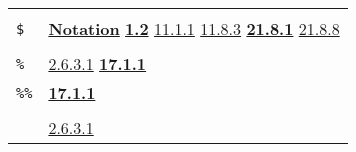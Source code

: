 \documentclass[a4paper,]{article}
\begin{document}
\begin{longtable}[]{@{}ll@{}}
\begin{minipage}[t]{0.70\columnwidth}
\strut
\end{minipage}\tabularnewline
\begin{minipage}[t]{0.24\columnwidth}\raggedright\strut
\texttt{\$}\strut
\end{minipage} & \begin{minipage}[t]{0.70\columnwidth}\raggedright\strut
\textbf{\href{00-front-matter.md\#notation}{Notation}} \textbf{\href{01-basic-introduction.md\#12-typing-1}{1.2}}
\href{11-input-output.md\#1111-input}{11.1.1} \href{11-input-output.md\#1183-tyi}{11.8.3}
\textbf{\href{21-interrupts.md\#2181-char-received}{21.8.1}} \href{21-interrupts.md\#2188-unblocked}{21.8.8}\strut
\end{minipage}\tabularnewline
\begin{minipage}[t]{0.24\columnwidth}\raggedright\strut
\strut
\end{minipage} & \begin{minipage}[t]{0.70\columnwidth}\raggedright\strut
\strut
\end{minipage}\tabularnewline
\begin{minipage}[t]{0.24\columnwidth}\raggedright\strut
\texttt{\%}\strut
\end{minipage} & \begin{minipage}[t]{0.70\columnwidth}\raggedright\strut
\href{02-read-evaluate-print.md\#2631-non-pnames}{2.6.3.1} \textbf{\href{17-macro-operations.md\#1711--and-}{17.1.1}}\strut
\end{minipage}\tabularnewline
\begin{minipage}[t]{0.24\columnwidth}\raggedright\strut
\texttt{\%\%}\strut
\end{minipage} & \begin{minipage}[t]{0.70\columnwidth}\raggedright\strut
\textbf{\href{17-macro-operations.md\#1711--and-}{17.1.1}}\strut
\end{minipage}\tabularnewline
\begin{minipage}[t]{0.24\columnwidth}\raggedright\strut
\strut
\end{minipage} & \begin{minipage}[t]{0.70\columnwidth}\raggedright\strut
\strut
\end{minipage}\tabularnewline
\begin{minipage}[t]{0.24\columnwidth}\raggedright\strut
\texttt{\textquotesingle{}}\strut
\end{minipage} & \begin{minipage}[t]{0.70\columnwidth}\raggedright\strut
\href{02-read-evaluate-print.md\#2631-non-pnames}{2.6.3.1}

\end{minipage}
\end{longtable}
\end{document}
